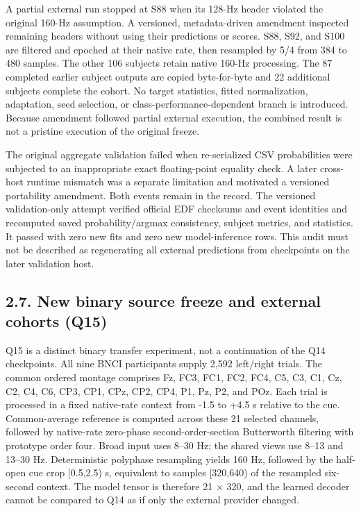 \documentclass[11pt]{article}
\begin{document}
A partial external run stopped at S88 when its 128-Hz header violated the original 160-Hz assumption. A versioned, metadata-driven amendment inspected remaining headers without using their predictions or scores. S88, S92, and S100 are filtered and epoched at their native rate, then resampled by 5/4 from 384 to 480 samples. The other 106 subjects retain native 160-Hz processing. The 87 completed earlier subject outputs are copied byte-for-byte and 22 additional subjects complete the cohort. No target statistics, fitted normalization, adaptation, seed selection, or class-performance-dependent branch is introduced. Because amendment followed partial external execution, the combined result is not a pristine execution of the original freeze.

The original aggregate validation failed when re-serialized CSV probabilities were subjected to an inappropriate exact floating-point equality check. A later cross-host runtime mismatch was a separate limitation and motivated a versioned portability amendment. Both events remain in the record. The versioned validation-only attempt verified official EDF checksums and event identities and recomputed saved probability/argmax consistency, subject metrics, and statistics. It passed with zero new fits and zero new model-inference rows. This audit must not be described as regenerating all external predictions from checkpoints on the later validation host.

\subsection*{2.7. New binary source freeze and external cohorts (Q15)}
Q15 is a distinct binary transfer experiment, not a continuation of the Q14 checkpoints. All nine BNCI participants supply 2,592 left/right trials. The common ordered montage comprises Fz, FC3, FC1, FC2, FC4, C5, C3, C1, Cz, C2, C4, C6, CP3, CP1, CPz, CP2, CP4, P1, Pz, P2, and POz. Each trial is processed in a fixed native-rate context from -1.5 to +4.5 s relative to the cue. Common-average reference is computed across these 21 selected channels, followed by native-rate zero-phase second-order-section Butterworth filtering with prototype order four. Broad input uses 8--30 Hz; the shared views use 8--13 and 13--30 Hz. Deterministic polyphase resampling yields 160 Hz, followed by the half-open cue crop [0.5,2.5) s, equivalent to samples [320,640) of the resampled six-second context. The model tensor is therefore 21 $\times$ 320, and the learned decoder cannot be compared to Q14 as if only the external provider changed.
\end{document}

